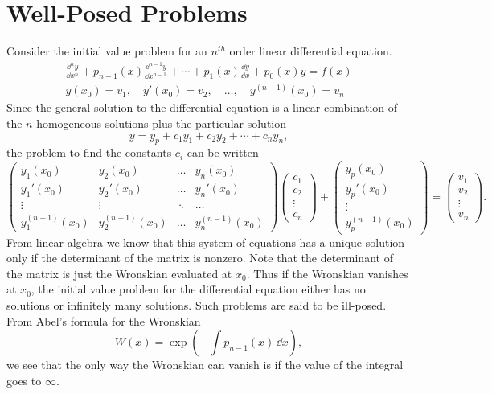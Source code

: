 \section{Well-Posed Problems}
Consider the initial value problem for an $n^{t h}$ order linear 
differential equation.
\begin{gather*}
  \frac{\dd^n y}{\dd x^n} + p_{n-1}(x) \frac{\dd^{n-1}y}{\dd x^{n-1}} + \cdots
  + p_1(x) \frac{\dd y}{\dd x} + p_0(x) y = f(x) \\
  y(x_0) = v_1, \quad y'(x_0) = v_2, \quad \ldots, \quad y^{(n-1)}(x_0) = v_n
\end{gather*}
Since the general solution to the differential equation is a linear combination
of the $n$ homogeneous solutions plus the particular solution
\[ y = y_p + c_1y_1 + c_2 y_2 + \cdots + c_n y_n, \]
the problem to find the constants $c_i$ can be written
\[
\begin{pmatrix}
  y_1(x_0)                &y_2(x_0)         &\ldots       &y_n(x_0) \\
  y_1'(x_0)               &y_2'(x_0)        &\ldots       &y_n'(x_0) \\
  \vdots                  &\vdots           &\ddots       &\ldots  \\
  y_1^{(n-1)}(x_0)        &y_2^{(n-1)}(x_0) &\ldots       &y_n^{(n-1)}(x_0) 
\end{pmatrix}
\begin{pmatrix}
  c_1 \\  c_2 \\  \vdots \\       c_n
\end{pmatrix}
+
\begin{pmatrix}
  y_p(x_0) \\     y_p'(x_0) \\    \vdots \\       y_p^{(n-1)}(x_0)
\end{pmatrix}
=
\begin{pmatrix}
  v_1 \\  v_2 \\  \vdots \\       v_n
\end{pmatrix} .
\]
From linear algebra we know that this system of equations has a unique solution
only if the determinant of the matrix is nonzero.  Note that the determinant
of the matrix is just the Wronskian evaluated at $x_0$.  Thus if the Wronskian
vanishes at $x_0$, the initial value problem for the differential equation 
either has no solutions or infinitely many solutions.  Such problems are
said to be ill-posed.  From Abel's formula for the Wronskian
\[ 
W(x) = \exp \left( - \int p_{n-1}(x)\,\dd x \right),
\]
we see that the only way the Wronskian can vanish is if the value
of the integral goes to $\infty$. 



